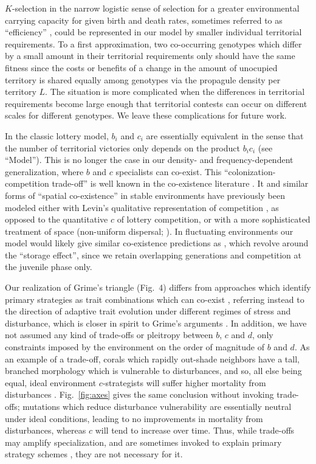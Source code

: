 \documentclass[11pt]{article}
\begin{document}
$K$-selection in the narrow logistic sense of selection for a greater environmental carrying capacity for given birth and death rates, sometimes referred to as ``efficiency'' \citep{macarthur_1967}, could be represented in our model by smaller individual territorial requirements. To a first approximation, two co-occurring genotypes which differ by a small amount in their territorial requirements only should have the same fitness since the costs or benefits of a change in the amount of unocupied territory is shared equally among genotypes via the propagule density per territory $L$. The situation is more complicated when the differences in territorial requirements become large enough that territorial contests can occur on different scales for different genotypes. We leave these complications for future work.

In the classic lottery model, $b_i$ and $c_i$ are essentially equivalent in the sense that the number of territorial victories only depends on the product $b_i c_i$ (see ``Model''). This is no longer the case in our density- and frequency-dependent generalization, where $b$ and $c$ specialists can co-exist. This ``colonization-competition trade-off'' is well known in the co-existence literature \citep{tilman_94}. It and similar forms of ``spatial co-existence'' in stable environments have previously been modeled either with Levin's  qualitative representation of competition \citep{levins_71,tilman_94}, as opposed to the quantitative $c$ of lottery competition, or with a more sophisticated treatment of space (non-uniform dispersal; \citealt{shmida_84,bolker_99}). In fluctuating environments our model would likely give similar co-existence predictions as \cite{chesson_1981}, which revolve around the ``storage effect'', since we retain overlapping generations and competition at the juvenile phase only. 

Our realization of Grime's triangle (Fig.~4) differs from approaches which identify primary strategies as trait combinations which can co-exist \citep{bolker_99}, referring instead to the direction of adaptive trait evolution under different regimes of stress and disturbance, which is closer in spirit to Grime's arguments \citep{grime_1974,grime_1977}. In addition, we have not assumed any kind of trade-offs or pleitropy between $b$, $c$ and $d$, only constraints imposed by the environment on the order of magnitude of $b$ and $d$. As an example of a trade-off, corals which rapidly out-shade neighbors have a tall, branched morphology which is vulnerable to disturbances, and so, all else being equal, ideal environment $c$-strategists will suffer higher mortality from disturbances \citep{darling_2012}. Fig.~\ref{fig:axes} gives the same conclusion without invoking trade-offs; mutations which reduce disturbance vulnerability are essentially neutral under ideal conditions, leading to no improvements in mortality from disturbances, whereas $c$ will tend to increase over time. Thus, while trade-offs may amplify specialization, and are sometimes invoked to explain primary strategy schemes \citep{macarthur_1967,winemiller_1992,aerts_1999}, they are not necessary for it.
\end{document}
